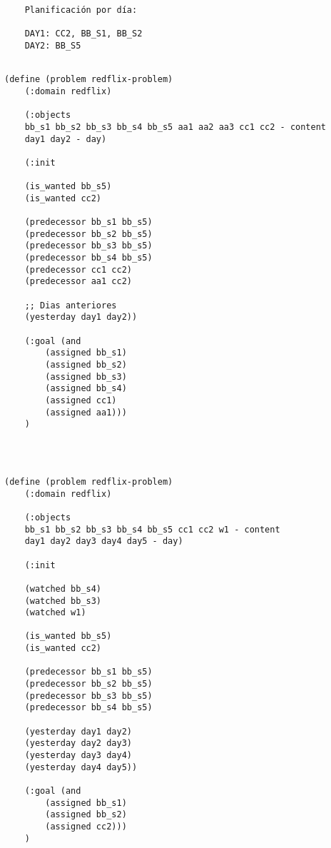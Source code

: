 \documentclass[a4paper]{article}
\begin{document}
	\begin{verbatim}
	Planificación por día:
	
	DAY1: CC2, BB_S1, BB_S2
	DAY2: BB_S5
		
	\end{verbatim}
	
	
	\noindent
	\begin{minipage}[t]{0.45\textwidth}
	\begin{lstlisting}[language=PDDL, caption={Joc de Prova 1 - Extensió 1}, label={lst:JP11}]                     
	(define (problem redflix-problem)
	(:domain redflix)
	
	(:objects
	bb_s1 bb_s2 bb_s3 bb_s4 bb_s5 aa1 aa2 aa3 cc1 cc2 - content
	day1 day2 - day)
	
	(:init

	(is_wanted bb_s5)
	(is_wanted cc2)
	
	(predecessor bb_s1 bb_s5)
	(predecessor bb_s2 bb_s5)
	(predecessor bb_s3 bb_s5)
	(predecessor bb_s4 bb_s5)
	(predecessor cc1 cc2)
	(predecessor aa1 cc2)
	
	;; Dias anteriores
	(yesterday day1 day2))
	
	(:goal (and
		(assigned bb_s1)
		(assigned bb_s2)
		(assigned bb_s3)
		(assigned bb_s4)
		(assigned cc1)
		(assigned aa1)))
	)
	
	
	
	\end{lstlisting}
		
	\end{minipage}
	\hfill
	\begin{minipage}[t]{0.45\textwidth}
	\begin{lstlisting}[language=PDDL, caption={Joc de Prova 2 - Extensió 1}, label={lst:JP21}]                     
	(define (problem redflix-problem)
	(:domain redflix)
	
	(:objects
	bb_s1 bb_s2 bb_s3 bb_s4 bb_s5 cc1 cc2 w1 - content
	day1 day2 day3 day4 day5 - day)
	
	(:init

	(watched bb_s4)
	(watched bb_s3)
	(watched w1)

	(is_wanted bb_s5)
	(is_wanted cc2)
	
	(predecessor bb_s1 bb_s5)
	(predecessor bb_s2 bb_s5)
	(predecessor bb_s3 bb_s5)
	(predecessor bb_s4 bb_s5)
	
	(yesterday day1 day2)
	(yesterday day2 day3)
	(yesterday day3 day4)
	(yesterday day4 day5))
	
	(:goal (and
		(assigned bb_s1)
		(assigned bb_s2)
		(assigned cc2)))
	)
	
			
		\end{lstlisting}
	\end{minipage}
	
\end{document}
